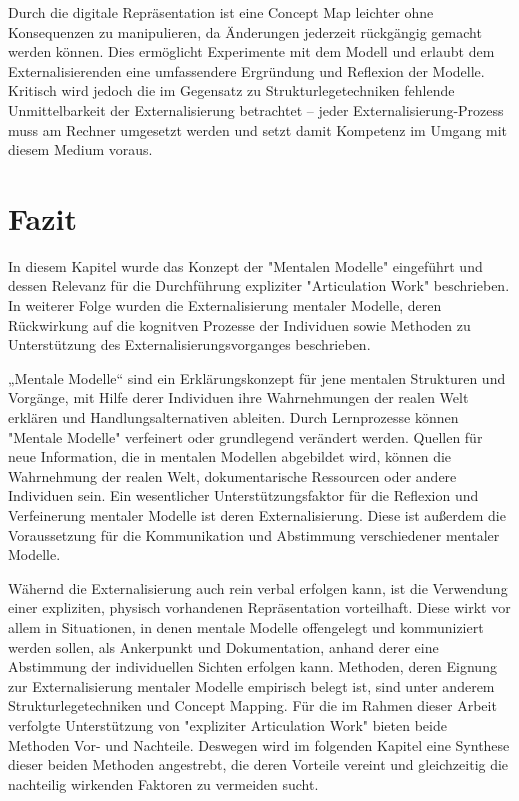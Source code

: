 Durch die digitale Repräsentation ist eine Concept Map leichter ohne Konsequenzen zu manipulieren, da Änderungen jederzeit rückgängig gemacht werden können. Dies ermöglicht Experimente mit dem Modell und erlaubt dem Externalisierenden eine umfassendere Ergründung und Reflexion der Modelle. Kritisch wird jedoch die im Gegensatz zu Strukturlegetechniken fehlende Unmittelbarkeit der Externalisierung betrachtet – jeder Externalisierung-Prozess muss am Rechner umgesetzt werden und setzt damit Kompetenz im Umgang mit diesem Medium voraus. \citet[][S. 30f]{Ifenthaler06}



\section{Fazit} %
\label{sec:mentale_modelle_fazit}

In diesem Kapitel wurde das Konzept der "Mentalen Modelle" eingeführt und dessen Relevanz für die Durchführung expliziter "Articulation Work" beschrieben. In weiterer Folge wurden die Externalisierung mentaler Modelle, deren Rückwirkung auf die kognitven Prozesse der Individuen sowie Methoden zu Unterstützung des Externalisierungsvorganges beschrieben.  

„Mentale Modelle“ sind ein Erklärungskonzept für jene mentalen Strukturen und Vorgänge, mit Hilfe derer Individuen ihre Wahrnehmungen der realen Welt erklären und Handlungsalternativen ableiten. Durch Lernprozesse können "Mentale Modelle" verfeinert oder grundlegend verändert werden. Quellen für neue Information, die in mentalen Modellen abgebildet wird, können die Wahrnehmung der realen Welt, dokumentarische Ressourcen oder andere Individuen sein. Ein wesentlicher Unterstützungsfaktor für die Reflexion und Verfeinerung mentaler Modelle ist deren Externalisierung. Diese ist außerdem die Voraussetzung für die Kommunikation und Abstimmung verschiedener mentaler Modelle.

Wähernd die Externalisierung auch rein verbal erfolgen kann, ist die Verwendung einer expliziten, physisch vorhandenen Repräsentation vorteilhaft. Diese wirkt vor allem in Situationen, in denen mentale Modelle offengelegt und kommuniziert werden sollen, als Ankerpunkt und Dokumentation, anhand derer eine Abstimmung der individuellen Sichten erfolgen kann. Methoden, deren Eignung zur Externalisierung mentaler Modelle empirisch belegt ist, sind unter anderem Strukturlegetechniken und Concept Mapping. Für die im Rahmen dieser Arbeit verfolgte Unterstützung von "expliziter Articulation Work" bieten beide Methoden Vor- und Nachteile. Deswegen wird im folgenden Kapitel eine Synthese dieser beiden Methoden angestrebt, die deren Vorteile vereint und gleichzeitig die nachteilig wirkenden Faktoren zu vermeiden sucht.

